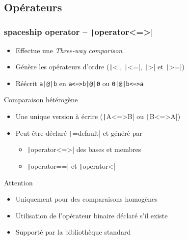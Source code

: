 \documentclass[C++.tex]{subfiles}
\begin{document}
\subsection*{Opérateurs}
\begin{frame}[fragile]
	\frametitle{spaceship operator -- \texttt|operator<=>|}
	\begin{itemize}
		\item Effectue une \og \textit{Three-way comparison}\fg{}
		\item Génère les opérateurs d'ordre (\texttt|<|, \texttt|<=|, \texttt|>| et \texttt|>=|)
		\item Réécrit \texttt{a|@|b} en \texttt{a<=>b|@|0} ou \texttt{0|@|b<=>a}
	\end{itemize}

	\begin{exampleblock}{Comparaison hétérogène}
		\begin{itemize}
			\item Une unique version à écrire (\texttt|A<=>B| ou \texttt|B<=>A|)
		\end{itemize}
	\end{exampleblock}
		
	\begin{itemize}
		\item Peut être déclaré \texttt|=default| et généré par
		\begin{itemize}
			\item \texttt|operator<=>| des bases et membres
			\item \texttt|operator==| et \texttt|operator<|
		\end{itemize}
	\end{itemize}

	\begin{alertblock}{Attention}
		\begin{itemize}
			\item Uniquement pour des comparaisons homogènes
		\end{itemize}
	\end{alertblock}

	\begin{itemize}
		\item Utilisation de l'opérateur binaire déclaré s'il existe


		\item Supporté par la bibliothèque standard
	\end{itemize}
\end{frame}
\end{document}
